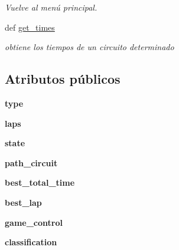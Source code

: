 \begin{DoxyCompactItemize}
\begin{DoxyCompactList}\small\item\em \-Vuelve al menú principal. \end{DoxyCompactList}\item 
def \hyperlink{classengine_1_1modes_1_1Mode_a758613d838040a2c1d9f3e63f0bd6a61}{get\-\_\-times}
\begin{DoxyCompactList}\small\item\em obtiene los tiempos de un circuito determinado \end{DoxyCompactList}\end{DoxyCompactItemize}
\subsection*{\-Atributos públicos}
\begin{DoxyCompactItemize}
\item 
\hypertarget{classengine_1_1modes_1_1Mode_aca72491f2130fe7ac207627027f4c054}{
{\bfseries type}}
\label{classengine_1_1modes_1_1Mode_aca72491f2130fe7ac207627027f4c054}

\item 
\hypertarget{classengine_1_1modes_1_1Mode_ae71e3fc293096e2dff7c8d03f100c2d1}{
{\bfseries laps}}
\label{classengine_1_1modes_1_1Mode_ae71e3fc293096e2dff7c8d03f100c2d1}

\item 
\hypertarget{classengine_1_1modes_1_1Mode_aa0ab5b973de0888d1634c13be36b13ff}{
{\bfseries state}}
\label{classengine_1_1modes_1_1Mode_aa0ab5b973de0888d1634c13be36b13ff}

\item 
\hypertarget{classengine_1_1modes_1_1Mode_a8502b8b014a176339f4f47f0fae6e41d}{
{\bfseries path\-\_\-circuit}}
\label{classengine_1_1modes_1_1Mode_a8502b8b014a176339f4f47f0fae6e41d}

\item 
\hypertarget{classengine_1_1modes_1_1Mode_a025f6758726a8e70d2cde1c3e5ae7f2c}{
{\bfseries best\-\_\-total\-\_\-time}}
\label{classengine_1_1modes_1_1Mode_a025f6758726a8e70d2cde1c3e5ae7f2c}

\item 
\hypertarget{classengine_1_1modes_1_1Mode_a63a89bef37725c3111bafbedaac291f6}{
{\bfseries best\-\_\-lap}}
\label{classengine_1_1modes_1_1Mode_a63a89bef37725c3111bafbedaac291f6}

\item 
\hypertarget{classengine_1_1modes_1_1Mode_af1a70d5ed1e8a284f52b965c532a308b}{
{\bfseries game\-\_\-control}}
\label{classengine_1_1modes_1_1Mode_af1a70d5ed1e8a284f52b965c532a308b}

\item 
\hypertarget{classengine_1_1modes_1_1Mode_a27ae6e9b83473ac856ed3b18454b90de}{
{\bfseries classification}}
\label{classengine_1_1modes_1_1Mode_a27ae6e9b83473ac856ed3b18454b90de}

\end{DoxyCompactItemize}



